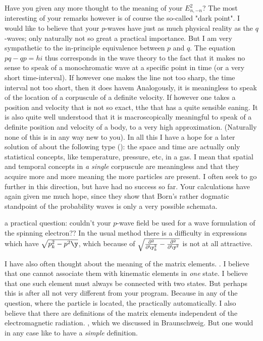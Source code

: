Have you given any more thought to the meaning of your $E^2_{n,-n}$? The most interesting of your remarks however is of course the so-called "dark point". I would like to believe that your $p$-waves have just as much physical reality as the $q$-waves; only naturally not so great a practical importance. But I am very sympathetic to the in-principle equivalence between $p$ and $q$. The equation $pq-qp=hi$ thus corresponds in the wave theory to the fact that it makes no sense to speak of a monochromatic wave at a specific point in time (or a very short time-interval). If however one makes the line not too sharp, the time interval not too short, then it does havem Analogously, it is meaningless to speak of the location of a corpuscule of a definite velocity. If however one takes a position and velocity that is not so exact, tthe that has a quite sensible eaning.
 It is also quite well understood that it is macroscopically meaningful to speak of a definite position and velocity of a body, to a very high approximation. (Naturally none of this is in any way new to you). In all this I have a hope for a later solution of about the following type (): the space and time are actually only statistical concepts, like temperature, pressure, etc, in a gas. I mean that spatial and temporal concepts in \textit{a single} corpuscule are meaningless and that they acquire more and more meaning the more particles are present. I often seek to go further in this direction, but have had no success so far. Your calculations have again given me much hope, since they show that Born's rather dogmatic standpoint of the probability waves is only a very possible schemata.
 
 a practical question: couldn't your $p$-wave field be used for a  wave formulation of the spinning electron?? In the usual method there is a difficulty in expressions which have $\sqrt{p^2_k - p^2\y}$, which because of $\sqrt{\frac{\partial^2}{\partial \y_k^2} - \frac{\partial^2}{\partial \y^2}}$ is not at all attractive.

I have also often thought about the meaning of the matrix elements. . I believe that one cannot associate them with kinematic elements in \textit{one} state. I believe that one such element must always be connected with two states. But perhaps this is after all not very different from your program. Because in any  of the question, where the particle is located, the   practically automatically. I also believe that there are definitions of the matrix elements independent of the electromagnetic radiation. , which we discussed in Braunschweig. But one would in any case like to have a \textit{simple} definition.

